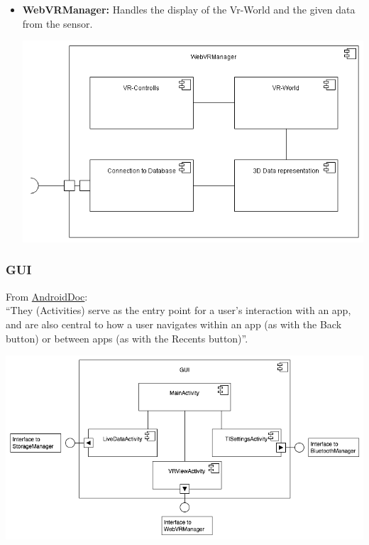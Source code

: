 \begin{itemize}
  \item \textbf{WebVRManager:} Handles the display of the Vr-World and the given data from the sensor.
  \begin{center}
	\includegraphics[scale=0.35]{pics/WebVRManager.png}
  \end{center}
\end{itemize}


\subsubsection{GUI}
From \href{https://developer.android.com/guide/components/activities.html}{AndroidDoc}: \\
``They (Activities) serve as the entry point for a user's interaction with an app, and are also central to how a user navigates within an app (as with the Back button) or between apps (as with the Recents button)''. \newline

\begin{center}
	\includegraphics[scale=0.35]{pics/GUI.png}
  \end{center}

